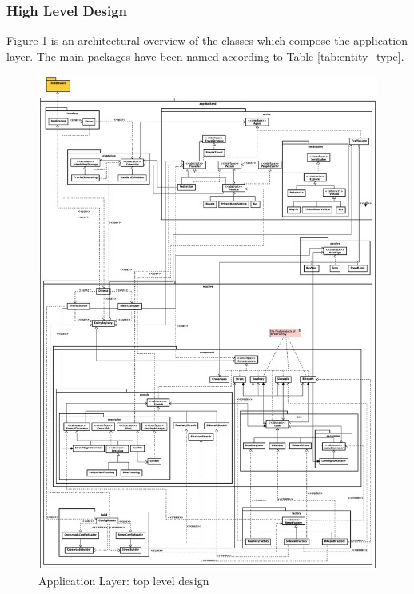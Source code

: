 \subsubsection{High Level Design}


Figure \ref{fig:sd-app-backend-architecture} is an architectural overview
of the classes which compose the application layer.
The main packages have been named according to Table \ref{tab:entity_type}.

\begin{figure}[H]
  \centering
  \includegraphics[width=.95\columnwidth]{images/solution/app/backend/app_backend_architecture.eps}
  \caption{Application Layer: top level design}
  \label{fig:sd-app-backend-architecture}
\end{figure}


